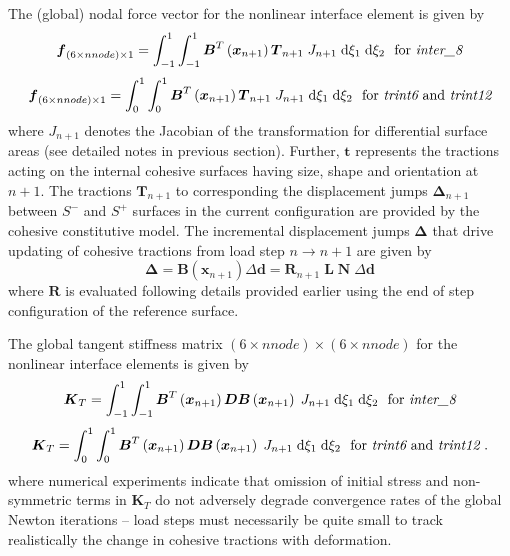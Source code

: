 \documentclass[11pt]{report}
\numberwithin{equation}{section}
\newcommand{\bmf } {\boldsymbol }  %
\newcommand{\ti}{\emph}
\begin{document}
The (global) nodal force vector for the nonlinear interface element is given by
%
\begin{equation}
\bmf{f}_{(6 \times nnode) \times 1} = \int_{-1}^1  \int_{-1}^1 
\bmf{B}^T\left( \bmf{x}_{n+1}\right ) \bmf{T}_{n+1} 
\; J_{n+1}  \;\mathrm{d}\xi_1  \;\mathrm{d}\xi_2 \ \ \mathrm{for\ \ti{inter\_8}} 
\end {equation}
%
\begin{equation}
\bmf{f}_{(6 \times nnode) \times 1} = \int_{0}^1  \int_{0}^{1} 
\bmf{B}^T\left( \bmf{x}_{n+1}\right ) \bmf{T}_{n+1} 
\; J_{n+1}  \;\mathrm{d}\xi_1  \;\mathrm{d}\xi_2 \ \ \mathrm{for\ \ti{trint6}\ and\ \ti{trint12}} 
\end {equation}
%
\noindent where $J_{n+1}$ denotes the Jacobian of the transformation for
differential surface areas (see detailed notes in previous section).  Further,  $\bmf{t}$
represents the tractions acting on the internal cohesive 
surfaces having size, shape and orientation at $n+1$. The tractions 
$\bmf{T}_{n+1}$ to corresponding the 
displacement jumps $\bmf{\Delta}_{n+1}$ between $S^-$ and 
$S^+$ surfaces in the current configuration 
are provided by the cohesive constitutive model. The incremental 
displacement jumps $\bmf{\Delta}$ that drive updating 
of cohesive tractions from load step $n \rightarrow n+1$ are given by
%
\begin{equation}
\bmf{\Delta}  = \bmf{B}\left( \bmf{x}_{n+1}\right) \Delta \bmf{d} =
\bmf{R}_{n+1}\; \bmf{L} \;\bmf{N} \;\Delta \bmf{d}
\end {equation}
%
\noindent where $\bmf{R}$  is evaluated following details provided earlier
using the end of step configuration of the reference surface.

The global tangent stiffness matrix 
$(6 \times nnode ) \times (6 \times nnode)$ 
for the nonlinear interface elements is given by
%
\begin{equation}
\bmf{K}_T = \int_{-1}^1  \int_{-1}^1 
\bmf{B}^T\left( \bmf{x}_{n+1}\right) \bmf{D} 
\bmf{B}\left( \bmf{x}_{n+1}\right) \; J_{n+1} 
\;\mathrm{d}\xi_1  \;\mathrm{d}\xi_2 \ \ \mathrm{for\ \ti{inter\_8}} 
\end {equation}
%
%
\begin{equation}
\bmf{K}_T = \int_{0}^1  \int_{0}^{1} 
\bmf{B}^T\left( \bmf{x}_{n+1}\right) \bmf{D} \bmf{B}
\left( \bmf{x}_{n+1}\right) \; J_{n+1}  \;\mathrm{d}\xi_1  \;\mathrm{d}\xi_2   
\ \ \mathrm{for\ \ti{trint6}\ and\ \ti{trint12}} \ .
\end {equation}
%
\noindent where numerical experiments indicate that 
omission of initial stress and non-symmetric terms in $\bmf{K}_T$  do not 
adversely degrade convergence rates of the global Newton iterations -- load steps 
must necessarily be quite small to track realistically the change in cohesive tractions
with deformation.
%
\end{document}
